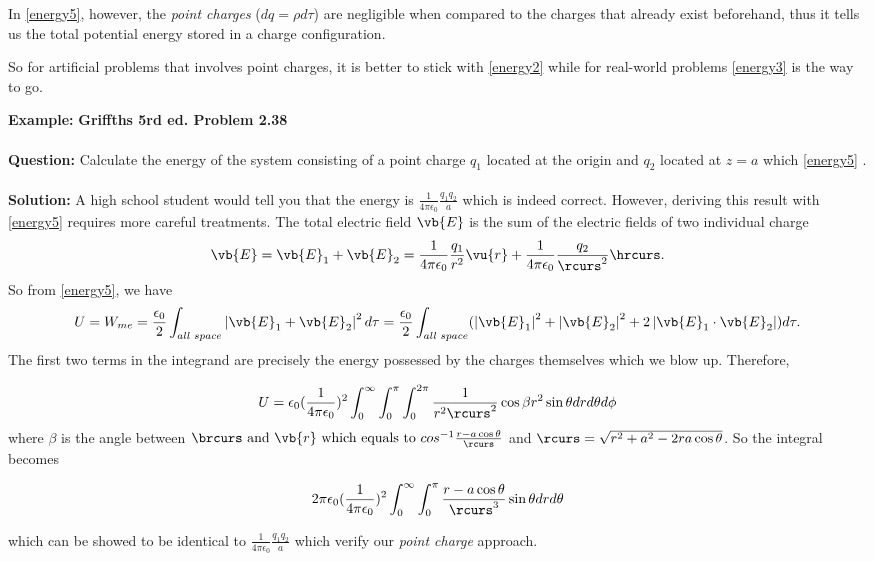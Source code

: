 \documentclass[a4paper,12pt]{report}
\begin{document}
	In \cref{energy5}, however, the \emph{point charges} (\(dq = \rho d\tau \))
	are negligible when compared to the charges that already exist beforehand, thus it tells us the total potential energy stored in a charge configuration.
	
	So for artificial problems that involves point charges, it is better to stick with \cref{energy2} while for real-world problems \cref{energy3} is the way to go.
	
	\begin{example_template}
		\textbf{Example:} \textbf{Griffths 5rd ed. Problem 2.38} \\ \\
		\textbf{Question:} Calculate the energy of the system consisting of a point charge \(q_1\) located at the origin and \(q_2\) located at \( z=a \) which \cref{energy5} .  \\ \\
		\textbf{Solution:}  A high school student would tell you that the energy is \(\frac{1}{4\pi\epsilon_0} \frac{q_1q_2}{a} \) which is indeed correct. However, deriving this result with  \cref{energy5} requires more careful treatments. The total electric field \(\vb{E} \) is the sum of the electric fields of two individual charge
		\begin{equation}
			\vb{E} = \vb{E} _{1} + \vb{E} _{2} = \frac{1}{4\pi\epsilon_0} \frac{q_1}{r^2} \vu{r} + \frac{1}{4\pi\epsilon_0} \frac{q_2}{\rcurs ^2} \hrcurs. 
		\end{equation}
		So from \cref{energy5}, we have 
		\begin{equation}
			U = W_{me} = \frac{\epsilon_0}{2} \int _{all \text{ } space} \left| \vb{E} _{1} + \vb{E} _{2}  \right| ^2 d\tau = \frac{\epsilon_0}{2} \int _{all \text{ } space} (\left| \vb{E} _{1}  \right| ^2 + \left| \vb{E} _{2}  \right| ^2 + 2\left| \vb{E} _{1} \cdot \vb{E} _{2}  \right|) d\tau .
		\end{equation}
		The first two terms in the integrand are precisely the energy possessed by the charges themselves which we blow up. Therefore,
		
		\begin{equation}
			U = \epsilon_0 (\frac{1}{4\pi\epsilon_0} )^2 \int_{0}^{\infty} \int_{0}^{\pi } \int_{0}^{2\pi }     \frac{1}{r^2\rcurs ^2} \cos \beta r^2\sin \theta drd\theta d\phi 
		\end{equation}
		where \(\beta \) is the angle between \(\brcurs \text{ and } \vb{r} \text{ which equals to } cos^{-1} \frac{r-a \cos \theta }{\rcurs }  \) and \(\rcurs = \sqrt{r^2 + a^2 -2ra\cos \theta } \). So the integral becomes
		
		\begin{equation}
			2\pi \epsilon_0 (\frac{1}{4\pi\epsilon_0} )^2 \int_{0}^{\infty} \int_{0}^{\pi } \frac{r-a \cos \theta }{\rcurs ^3} \sin \theta drd\theta  
		\end{equation}
		
		which can be showed to be identical to \(\frac{1}{4\pi\epsilon_0} \frac{q_1q_2}{a} \) which verify our \emph{point charge} approach.	
	\end{example_template}
	
\end{document}
